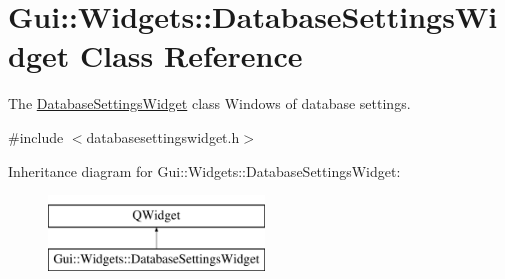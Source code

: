 \hypertarget{classGui_1_1Widgets_1_1DatabaseSettingsWidget}{}\section{Gui\+:\+:Widgets\+:\+:Database\+Settings\+Widget Class Reference}
\label{classGui_1_1Widgets_1_1DatabaseSettingsWidget}


The \hyperlink{classGui_1_1Widgets_1_1DatabaseSettingsWidget}{Database\+Settings\+Widget} class Windows of database settings.  




{\ttfamily \#include $<$databasesettingswidget.\+h$>$}

Inheritance diagram for Gui\+:\+:Widgets\+:\+:Database\+Settings\+Widget\+:\begin{figure}[H]
\begin{center}
\leavevmode
\includegraphics[height=2.000000cm]{de/d51/classGui_1_1Widgets_1_1DatabaseSettingsWidget}
\end{center}
\end{figure}
